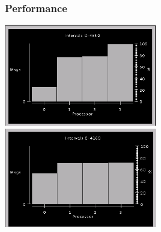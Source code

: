 \begin{frame}
\frametitle{Performance}
\begin{centering}
\includegraphics[width=0.5\textwidth]{figures/beforeLB}
\includegraphics[width=0.5\textwidth]{figures/afterLB}
\end{centering}
\end{frame}
